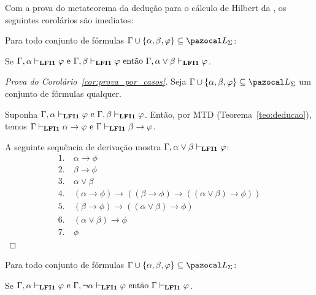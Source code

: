         Com a prova do metateorema da dedução para o cálculo de Hilbert da \lfium{}, os seguintes corolários são imediatos:

        \begin{corolario}\label{cor:prova_por_casos}
            Para todo conjunto de fórmulas $\Gamma \cup \{\alpha, \beta, \phi\} \subseteq \ling{}$:

            \centering
            {\normalfont{}Se $\Gamma, \alpha \vdash_{{\normalfont\textbf{LFI1}}{}} \varphi \text{ e }\Gamma, \beta \vdash_{{\normalfont\textbf{LFI1}}{}} \varphi \text{ então } \Gamma, \alpha \lor \beta \vdash_{{\normalfont\textbf{LFI1}}{}} \varphi$.}
        \end{corolario}

        \begin{proof}[Prova do Corolário~\ref{cor:prova_por_casos}]
            Seja $\Gamma \cup \{\alpha, \beta, \phi\} \subseteq \ling{}$ um conjunto de fórmulas qualquer.
            
            Suponha $\Gamma, \alpha \vdash_{{\normalfont\textbf{LFI1}}{}} \varphi \text{ e }\Gamma, \beta \vdash_{{\normalfont\textbf{LFI1}}{}} \varphi$. 
            Então, por MTD (Teorema~\ref{teo:deducao}), temos $\Gamma \vdash_{{\normalfont\textbf{LFI1}}{}} \alpha \to \varphi \text{ e }\Gamma \vdash_{{\normalfont\textbf{LFI1}}{}} \beta \to \varphi$.

            A seguinte sequência de derivação mostra $\Gamma, \alpha \lor \beta \vdash_{{\normalfont\textbf{LFI1}}{}} \varphi$:
            \begin{align*}
                1. ~& \alpha \to \phi \tag{MTD aplicado à suposição} \\
                2. ~& \beta \to \phi \tag{MTD aplicado à suposição} \\
                3. ~& \alpha \lor \beta \tag{Premissa} \\
                4. ~& (\alpha \to \phi) \to ((\beta \to \phi) \to ((\alpha \lor \beta) \to \phi)) \tag{Ax8} \\
                5. ~& (\beta \to \phi) \to ((\alpha \lor \beta) \to \phi) \tag{MP 1, 4}\\
                6. ~& (\alpha \lor \beta) \to \phi \tag{MP 2, 5} \\
                7. ~& \phi \tag{MP 3, 6}
            \end{align*}
        \end{proof}


        \begin{corolario}\label{cor:caso_neg}
            Para todo conjunto de fórmulas $\Gamma \cup \{\alpha, \beta, \phi\} \subseteq \ling{}$:

            \centering
            {\normalfont{}Se $\Gamma, \alpha \vdash_{{\normalfont\textbf{LFI1}}{}} \varphi \text{ e }\Gamma, \neg\alpha \vdash_{{\normalfont\textbf{LFI1}}{}} \varphi \text{ então } \Gamma \vdash_{{\normalfont\textbf{LFI1}}{}} \varphi$.}
        \end{corolario}

